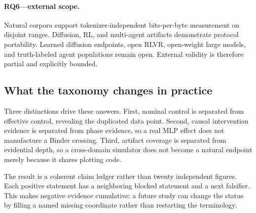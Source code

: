\paragraph{RQ6---external scope.}
Natural corpora support tokenizer-independent bits-per-byte measurement on
disjoint ranges. Diffusion, RL, and multi-agent artifacts demonstrate protocol
portability. Learned diffusion endpoints, open RLVR, open-weight large models,
and truth-labeled agent populations remain open. External validity is therefore
partial and explicitly bounded.

\subsection{What the taxonomy changes in practice}

Three distinctions drive these answers. First, nominal control is separated
from effective control, revealing the duplicated data point. Second, causal
intervention evidence is separated from phase evidence, so a real MLP effect
does not manufacture a Binder crossing. Third, artifact coverage is separated
from evidential depth, so a cross-domain simulator does not become a natural
endpoint merely because it shares plotting code.

The result is a coherent claim ledger rather than twenty independent figures.
Each positive statement has a neighboring blocked statement and a next
falsifier. This makes negative evidence cumulative: a future study can change
the status by filling a named missing coordinate rather than restarting the
terminology.

\FloatBarrier
